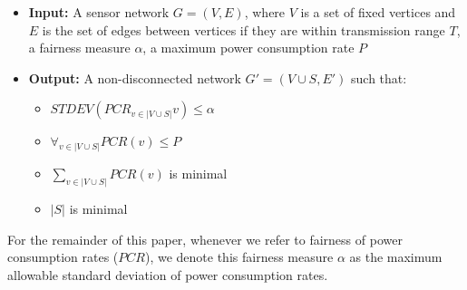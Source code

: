 \begin{itemize}
 \item \textbf{Input:} A sensor network $G = (V, E)$, where $V$ is a set of fixed vertices and $E$ is the set of edges between vertices if they are within transmission range $T$, a fairness measure $\alpha$, a maximum power consumption rate $P$

\item \textbf{Output:} A non-disconnected network $G' = (V \cup S, E')$ such that:
	\begin{itemize}
		\item $STDEV( PCR_{v \in |V \cup S|} v) \leq \alpha$
		\item $\forall_{v \in |V \cup S|} PCR(v) \leq P$
		\item $\sum_{v \in |V \cup S|} PCR(v)$ is minimal
		\item $|S|$ is minimal
	\end{itemize}
\end{itemize}

For the remainder of this paper, whenever we refer to fairness of power consumption rates ($PCR$), we denote this fairness measure $\alpha$ as the maximum allowable standard deviation of power consumption rates.


